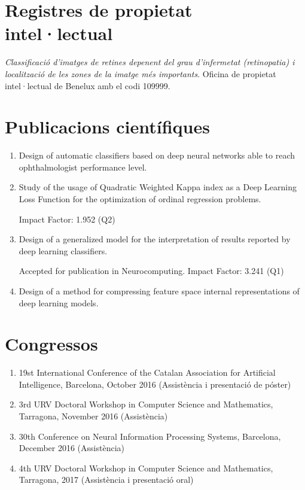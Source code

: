 \documentclass{article}
\begin{document}
\section*{Registres de propietat intel·lectual}

\emph{Classificació d’imatges de retines depenent del grau d’infermetat (retinopatia) i localització de les zones de la imatge més importants}. Oficina de propietat intel·lectual de Benelux amb el codi 109999.
	
\section*{Publicacions científiques}
	
	\begin{enumerate}
		\item Design of automatic classifiers based on deep neural networks able to reach ophthalmologist performance level.
		
		
		\item Study of the usage of Quadratic Weighted Kappa index as a Deep Learning Loss Function for the optimization of ordinal regression problems.
		
		 Impact Factor: 1.952 (Q2)
		
		\item Design of a generalized model for the interpretation of results reported by deep learning classifiers.
		
		 Accepted for publication in Neurocomputing. Impact Factor: 3.241 (Q1)
		
		\item Design of a method for compressing feature space internal representations of deep learning models.
		
		
	\end{enumerate}
	
\section*{Congressos}

	\begin{enumerate}
\item 19st International Conference of the Catalan Association for Artificial Intelligence, Barcelona, October 2016 (Assistència i presentació de póster)
\item 3rd URV Doctoral Workshop in Computer Science and Mathematics, Tarragona, November 2016 (Assistència)
\item 30th Conference on Neural Information Processing Systems, Barcelona, December 2016 (Assistència)
\item 4th URV Doctoral Workshop in Computer Science and Mathematics, Tarragona, 2017 (Assistència i presentació oral)
	\end{enumerate}
	
\end{document}
